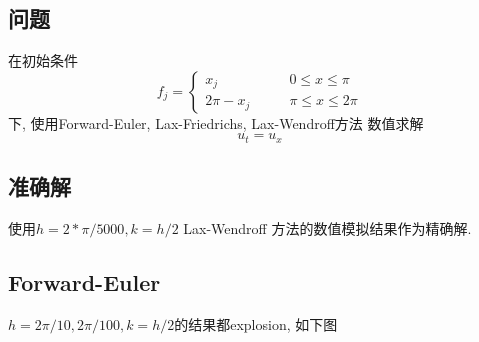 \subsection{问题}
在初始条件 
\[f_j = \left\{ 
\begin{aligned}
  x_j \qquad         &0 \leq x \leq \pi \\
  2 \pi - x_j \qquad &\pi \leq x \leq 2\pi 
\end{aligned}
 \right. \]
 下, 使用Forward-Euler, Lax-Friedrichs, Lax-Wendroff方法
 数值求解 
 \[ u_t = u_x \]

\subsection{准确解}
使用$h = 2 * \pi / 5000, k = h / 2$ Lax-Wendroff 方法的数值模拟结果作为精确解.


\subsection{Forward-Euler}
$h = 2 \pi / 10, 2 \pi / 100, k = h / 2$的结果都explosion, 如下图

\begin{figure}[!h]
  \centering
\end{figure}

